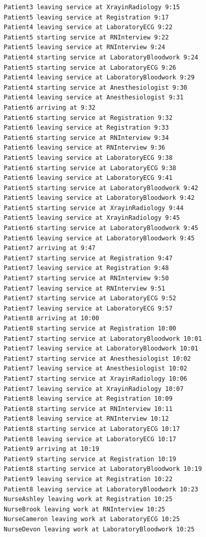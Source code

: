 \documentclass[12pt]{article}
\begin{document}
\begin{verbatim}
		Patient3 leaving service at XrayinRadiology 9:15
		Patient5 leaving service at Registration 9:17
		Patient4 leaving service at LaboratoryECG 9:22
		Patient5 starting service at RNInterview 9:22
		Patient5 leaving service at RNInterview 9:24
		Patient4 starting service at LaboratoryBloodwork 9:24
		Patient5 starting service at LaboratoryECG 9:26
		Patient4 leaving service at LaboratoryBloodwork 9:29
		Patient4 starting service at Anesthesiologist 9:30
		Patient4 leaving service at Anesthesiologist 9:31
		Patient6 arriving at 9:32
		Patient6 starting service at Registration 9:32
		Patient6 leaving service at Registration 9:33
		Patient6 starting service at RNInterview 9:34
		Patient6 leaving service at RNInterview 9:36
		Patient5 leaving service at LaboratoryECG 9:38
		Patient6 starting service at LaboratoryECG 9:38
		Patient6 leaving service at LaboratoryECG 9:41
		Patient5 starting service at LaboratoryBloodwork 9:42
		Patient5 leaving service at LaboratoryBloodwork 9:42
		Patient5 starting service at XrayinRadiology 9:44
		Patient5 leaving service at XrayinRadiology 9:45
		Patient6 starting service at LaboratoryBloodwork 9:45
		Patient6 leaving service at LaboratoryBloodwork 9:45
		Patient7 arriving at 9:47
		Patient7 starting service at Registration 9:47
		Patient7 leaving service at Registration 9:48
		Patient7 starting service at RNInterview 9:50
		Patient7 leaving service at RNInterview 9:51
		Patient7 starting service at LaboratoryECG 9:52
		Patient7 leaving service at LaboratoryECG 9:57
		Patient8 arriving at 10:00
		Patient8 starting service at Registration 10:00
		Patient7 starting service at LaboratoryBloodwork 10:01
		Patient7 leaving service at LaboratoryBloodwork 10:01
		Patient7 starting service at Anesthesiologist 10:02
		Patient7 leaving service at Anesthesiologist 10:02
		Patient7 starting service at XrayinRadiology 10:06
		Patient7 leaving service at XrayinRadiology 10:07
		Patient8 leaving service at Registration 10:09
		Patient8 starting service at RNInterview 10:11
		Patient8 leaving service at RNInterview 10:12
		Patient8 starting service at LaboratoryECG 10:17
		Patient8 leaving service at LaboratoryECG 10:17
		Patient9 arriving at 10:19
		Patient9 starting service at Registration 10:19
		Patient8 starting service at LaboratoryBloodwork 10:19
		Patient9 leaving service at Registration 10:22
		Patient8 leaving service at LaboratoryBloodwork 10:23
		NurseAshley leaving work at Registration 10:25
		NurseBrook leaving work at RNInterview 10:25
		NurseCameron leaving work at LaboratoryECG 10:25
		NurseDevon leaving work at LaboratoryBloodwork 10:25

\end{verbatim}
\end{document}
